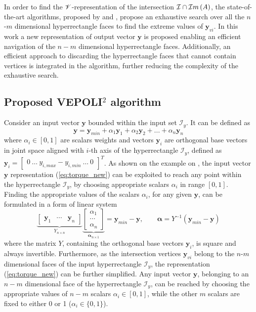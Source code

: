 In order to find the  $\mathscr{V}$-representation of the intersection  $\mathcal{I}\cap \mathcal{I}m\left(A\right)$, the state-of-the-art algorithms, proposed by \citet{chiacchio_evaluation_1996} and \citet{sasaki2011vertex}, propose an exhaustive search over all the $n$-$m$ dimensional hyperrectangle faces to find the extreme values of $\bm{y}_{vi}$. In this work a new representation of output vector $\bm{y}$ is proposed enabling an efficient navigation of the $n-m$ dimensional hyperrectangle faces. Additionally, an efficient approach to discarding the hyperrectangle faces that cannot contain vertices is integrated in the algorithm, further reducing the complexity of the exhaustive search.

\subsection{Proposed VEPOLI$^2$ algorithm}
Consider an input vector $\bm{y}$ bounded within the input set $\mathcal{I}_y$. It can be defined as
\begin{equation}
    \bm{y} = {\bm{y}}_{min} + \alpha_1 \bm{y}_1+ \alpha_2 \bm{y}_2 + ... + \alpha_n \bm{y}_n
    \label{eq:torque_new}
\end{equation}
where $\alpha_i \in [0,1]$ are scalars weights and vectors $\bm{y}_i$ are orthogonal base vectors in joint space aligned with $i$-th axis of the hyperrectangle $\mathcal{I}_y$, defined as $\bm{y}_i = \begin{bmatrix} 0~\ldots~y_{i,max} - y_{i,min}~\ldots~0 \end{bmatrix}^T$. As shown on the example on , the input vector $\bm{y}$ representation (\ref{eq:torque_new}) can be exploited to reach any point within the hyperrectangle $\mathcal{I}_y$, by choosing appropriate scalars $\alpha_i$ in range $[0,1]$. Finding the appropriate values of the scalars $\alpha_i$, for any given $\bm{y}$, can be formulated in a form of linear system
\begin{equation}
\underbrace{\begin{bmatrix}
    \bm{y}_1&\cdots&\bm{y}_n
\end{bmatrix}}_{Y_{n\times n}}\underbrace{\begin{bmatrix}
    \alpha_1\\
    \cdots\\
    \alpha_n
\end{bmatrix}}_{\bm{\alpha}_{n\times 1}} = \bm{y}_{min} - \bm{y}, \qquad  \bm{\alpha} = Y^{-1}(\bm{y}_{min} - \bm{y})
\label{eq:define_Y_Alpha}
\end{equation}
where the matrix $Y$, containing the orthogonal base vectors $\bm{y}_i$, is square and always invertible. 
Furthermore, as the intersection vertices $\bm{y}_{vi}$ belong to the $n$-$m$ dimensional faces of the input hyperrectangle $\mathcal{I}_y$, the representation (\ref{eq:torque_new}) can be further simplified. Any input vector $\bm{y}$, belonging to an $n-m$ dimensional face of the hyperrectangle $\mathcal{I}_y$, can be reached by choosing the appropriate values of $n-m$ scalars $\alpha_i\in[0,1]$, while the other $m$ scalars are fixed to either 0 or 1 ($\alpha_i\in\{0,1\}$).

